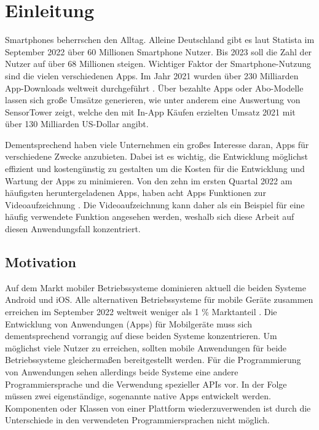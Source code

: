 \chapter{Einleitung}
\label{ch:Einleitung}


Smartphones beherrschen den Alltag.
Alleine Deutschland gibt es laut Statista \cite{Statista_SmartphonesDeutschland} im September 2022 über 60 Millionen Smartphone Nutzer.
Bis 2023 soll die Zahl der Nutzer auf über 68 Millionen steigen.
Wichtiger Faktor der Smartphone-Nutzung sind die vielen verschiedenen Apps.
Im Jahr 2021 wurden über 230 Milliarden App-Downloads weltweit durchgeführt \cite{Statista_AppDownloads}.
Über bezahlte Apps oder Abo-Modelle lassen sich große Umsätze generieren, wie unter anderem eine Auswertung von SensorTower \cite{SensorTower_AppUmsatz} zeigt, welche den mit In-App Käufen erzielten Umsatz 2021 mit über 130 Milliarden US-Dollar angibt.

Dementsprechend haben viele Unternehmen ein großes Interesse daran, Apps für verschiedene Zwecke anzubieten.
Dabei ist es wichtig, die Entwicklung möglichst effizient und kostengünstig zu gestalten um die Kosten für die Entwicklung und Wartung der Apps zu minimieren.
Von den zehn im ersten Quartal 2022 am häufigsten heruntergeladenen Apps, haben acht Apps Funktionen zur Videoaufzeichnung \cite{Forbes_TopApps}.
Die Videoaufzeichnung kann daher als ein Beispiel für eine häufig verwendete Funktion angesehen werden, weshalb sich diese Arbeit auf diesen Anwendungsfall konzentriert.


\section{Motivation}
\label{sec:Motivation}

Auf dem Markt mobiler Betriebssysteme dominieren aktuell die beiden Systeme Android und iOS.
Alle alternativen Betriebssysteme für mobile Geräte zusammen erreichen im September 2022 weltweit weniger als 1 \% Marktanteil \cite{mobile_market_share}.
Die Entwicklung von Anwendungen (Apps) für Mobilgeräte muss sich dementsprechend vorrangig auf diese beiden Systeme konzentrieren.
Um möglichst viele Nutzer zu erreichen, sollten mobile Anwendungen für beide Betriebssysteme gleichermaßen bereitgestellt werden.
Für die Programmierung von Anwendungen sehen allerdings beide Systeme eine andere Programmiersprache und die Verwendung spezieller \acp{API} vor.
In der Folge müssen zwei eigenständige, sogenannte native Apps entwickelt werden.
Komponenten oder Klassen von einer Plattform wiederzuverwenden ist durch die Unterschiede in den verwendeten Programmiersprachen nicht möglich.

